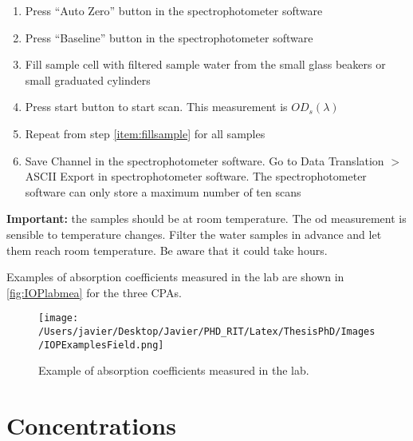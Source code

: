 \begin{appendices}
\begin{enumerate}[itemsep=2pt,parsep=2pt]
  \item Press ``Auto Zero'' button in the spectrophotometer software
  \item Press ``Baseline'' button in the spectrophotometer software
  \item Fill sample cell with filtered sample water from the small glass beakers or small graduated cylinders \label{item:fillsample}
  \item Press start button to start scan. This measurement is $OD_s(\lambda)$
  \item Repeat from step \ref{item:fillsample} for all samples
  \item Save Channel in the spectrophotometer software. Go to Data Translation $>$ ASCII Export in spectrophotometer software. The spectrophotometer software can only store a maximum number of ten scans 
\end{enumerate}
\textbf{Important:} the samples should be at room temperature. The \gls{od} measurement is sensible to temperature changes. Filter the water samples in advance and let them reach room temperature. Be aware that it could take hours.

Examples of absorption coefficients measured in the lab are shown in \autoref{fig:IOPlabmea} for the three CPAs.

\begin{figure}[htb!]
\centering
     \texttt{[image: /Users/javier/Desktop/Javier/PHD\_RIT/Latex/ThesisPhD/Images/IOPExamplesField.png]} 
\caption{Example of absorption coefficients measured in the lab. \label{fig:IOPlabmea}}
\end{figure}     

\section{Concentrations}


\end{appendices}
